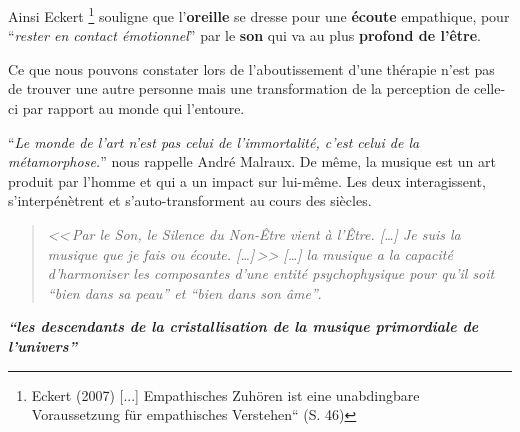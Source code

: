  
Ainsi Eckert \autocite{seminar_zuerich}\footnote{Eckert (2007)%
  [...] Empathisches Zuhören ist eine unabdingbare Voraussetzung für empathisches Verstehen“ (S. 46)} souligne que l'\textbf{oreille }se dresse pour une\textbf{ écoute} empathique, pour ``\textit{rester en contact émotionnel}'' par le \textbf{son} qui va au plus \textbf{profond de
  l'être}.


Ce que nous pouvons constater lors de l'aboutissement
d'une thérapie n'est pas de trouver une autre personne mais une transformation
de la perception de celle-ci par rapport au monde qui l'entoure.


\enquote{\emph{Le monde de
	l'art n'est pas celui de l'immortalité, c'est celui de la métamorphose.}}
nous rappelle André Malraux. De même, la musique est un art produit par l'homme et qui a un impact
sur lui-même. Les deux interagissent, s'interpénètrent et s'auto-transforment
au cours des siècles.
\begin{quotation}
\emph{<<\,\emph{Par le Son, le Silence du Non-Être vient à l'Être}. [\dots] 
\textsl{Je suis}
	\emph{la musique que je fais ou écoute}. [\dots]\,>>
[\ldots] \emph{la musique a la capacité d'harmoniser
les composantes d'une entité psychophysique pour qu'il soit ``bien
dans sa peau'' et ``bien dans son âme}''}.\, \autocite[ch. 1, p.8]{viret:b}
\end{quotation}


\textit{\textbf{``les descendants de la  cristallisation de la musique primordiale de
l'univers''}} \autocite{delbaz_recherche_2016}











